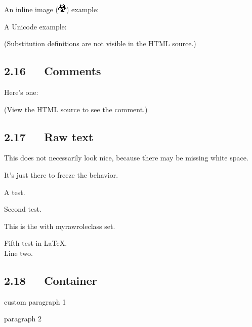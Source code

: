 \documentclass[a4paper]{article}
\begin{document}
An inline image (\includegraphics{../../../docs/user/rst/images/biohazard.png}) example:

A Unicode example:

(Substitution definitions are not visible in the HTML source.)


\subsection{2.16   Comments%
  \label{comments}%
}

Here’s one:

% 
% 

(View the HTML source to see the comment.)


\subsection{2.17   Raw text%
  \label{raw-text}%
}

This does not necessarily look nice, because there may be missing white space.

It’s just there to freeze the behavior.

A test.

Second test.


This is the  with myrawroleclass set.

Fifth test in LaTeX.\\Line two.


\subsection{2.18   Container%
  \label{container}%
}

\begin{DUclass}{custom}
paragraph 1

paragraph 2
\end{DUclass}

\end{document}

